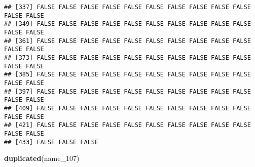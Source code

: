 \documentclass[
]{article}
\newenvironment{Shaded}{\begin{snugshade}}{\end{snugshade}}
\newcommand{\FunctionTok}[1]{\textcolor[rgb]{0.13,0.29,0.53}{\textbf{#1}}}
\newcommand{\NormalTok}[1]{#1}
\begin{document}
\begin{verbatim}
## [337] FALSE FALSE FALSE FALSE FALSE FALSE FALSE FALSE FALSE FALSE FALSE FALSE
## [349] FALSE FALSE FALSE FALSE FALSE FALSE FALSE FALSE FALSE FALSE FALSE FALSE
## [361] FALSE FALSE FALSE FALSE FALSE FALSE FALSE FALSE FALSE FALSE FALSE FALSE
## [373] FALSE FALSE FALSE FALSE FALSE FALSE FALSE FALSE FALSE FALSE FALSE FALSE
## [385] FALSE FALSE FALSE FALSE FALSE FALSE FALSE FALSE FALSE FALSE FALSE FALSE
## [397] FALSE FALSE FALSE FALSE FALSE FALSE FALSE FALSE FALSE FALSE FALSE FALSE
## [409] FALSE FALSE FALSE FALSE FALSE FALSE FALSE FALSE FALSE FALSE FALSE FALSE
## [421] FALSE FALSE FALSE FALSE FALSE FALSE FALSE FALSE FALSE FALSE FALSE FALSE
## [433] FALSE FALSE FALSE
\end{verbatim}

\begin{Shaded}
\begin{Highlighting}[]
\FunctionTok{duplicated}\NormalTok{(name\_107)}
\end{Highlighting}
\end{Shaded}
\end{document}

